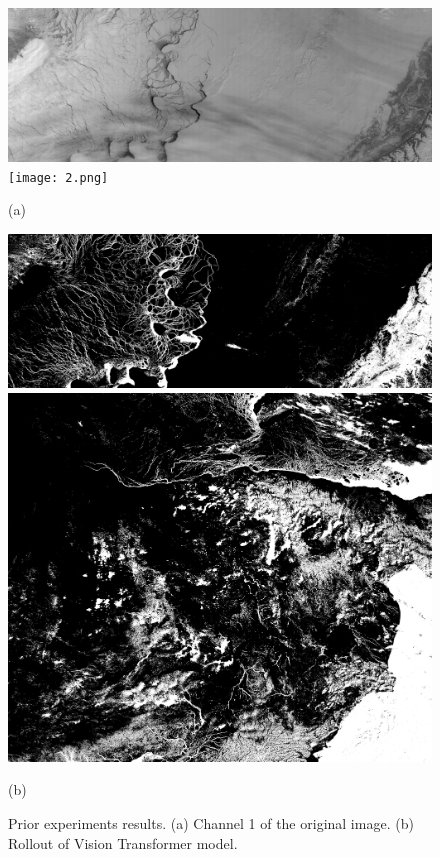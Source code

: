 \documentclass{article}
\begin{document}
        \begin{figure}[ht]
            \centering
            \begin{minipage}{0.49\hsize}
                \centering
                \includegraphics[width = 1\hsize]{1.png}
                \texttt{[image: 2.png]}
                \caption*{(a)}
            \end{minipage}
            \begin{minipage}{0.49\hsize}
                \centering
                \includegraphics[width = 1\hsize]{1_vit.png}
                \includegraphics[width = 1\hsize]{2_vit.png}
                \caption*{(b)}
            \end{minipage}
            \caption{
                Prior experiments results.
                (a) Channel 1 of the original image.
                (b) Rollout of Vision Transformer model.
            }
            \label{fig:vit}
        \end{figure}
\end{document}
